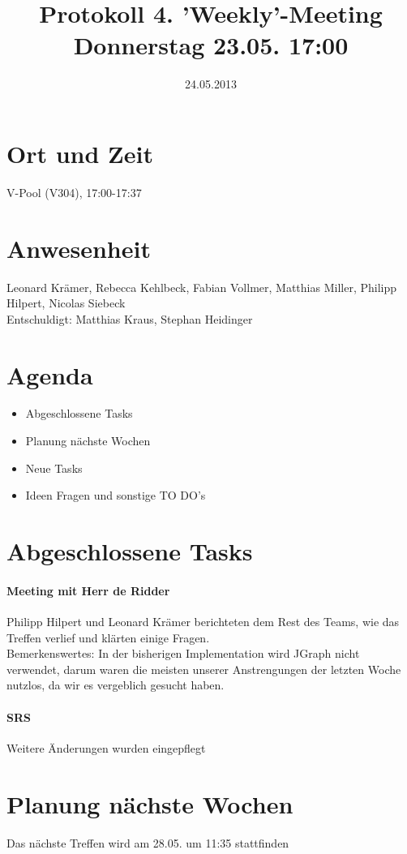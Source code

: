 \documentclass{scrartcl}
\date{24.05.2013}
\title{Protokoll 4. 'Weekly'-Meeting Donnerstag 23.05. 17:00}
\begin{document}
\maketitle
\section{Ort und Zeit}
V-Pool (V304), 17:00-17:37 \\
\section{Anwesenheit}
Leonard Krämer,  Rebecca Kehlbeck, Fabian Vollmer, Matthias Miller, Philipp Hilpert, Nicolas Siebeck \\ Entschuldigt: Matthias Kraus, Stephan Heidinger
\section{Agenda}
\begin{itemize}
\item Abgeschlossene Tasks
\item Planung nächste Wochen
\item Neue Tasks
\item Ideen Fragen und sonstige TO DO's
\end{itemize}

\section{Abgeschlossene Tasks}
\paragraph{Meeting mit Herr de Ridder}
Philipp Hilpert und Leonard Krämer berichteten dem Rest des Teams, wie das Treffen verlief und klärten einige Fragen. \\
Bemerkenswertes: In der bisherigen Implementation wird JGraph nicht verwendet, darum waren die meisten unserer Anstrengungen der letzten Woche nutzlos, da wir es vergeblich gesucht haben.
\paragraph{SRS} Weitere Änderungen wurden eingepflegt
\section{ Planung nächste Wochen}
Das nächste Treffen wird am 28.05. um 11:35 stattfinden
\end{document}
